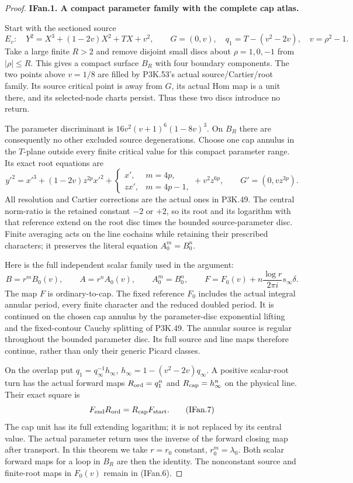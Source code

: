 \begin{proof}
\par\medskip\noindent\textbf{IFan.1. A compact parameter family with the complete cap atlas.}\par\nopagebreak[4]

Start with the sectioned source
\[
 E_v:\quad Y^2=X^3+(1-2v)X^2+TX+v^2,\qquad G=(0,v),
 \quad q_1=T-(v^2-2v),\quad v=\rho^2-1.              \tag{IFan.4}
\]
Take a large finite \(R>2\) and remove disjoint small discs about
\(\rho=1,0,-1\) from \(|\rho|\le R\). This gives a compact surface
\(B_R\) with four boundary components. The two points above \(v=1/8\)
are filled by P3K.53's actual source/Cartier/root family. Its source
critical point is away from \(G\), its actual Hom map is a unit there,
and its selected-node charts persist. Thus these two discs introduce
no return.

The parameter discriminant is \(16v^2(v+1)^6(1-8v)^3\). On \(B_R\)
there are consequently no other excluded source degenerations. Choose
one cap annulus in the \(T\)-plane outside every finite critical value
for this compact parameter range. Its exact root equations are
\[
 y'^2=x'^3+(1-2v)z^{2p}x'^2+
 \begin{cases}x',&m=4p,\\zx',&m=4p-1,\end{cases}
 +v^2z^{6p},\qquad G'=(0,vz^{3p}).                   \tag{IFan.5}
\]
All resolution and Cartier corrections are the actual ones in P3K.49.
The central norm-ratio is the retained constant \(-2\) or \(+2\), so
its root and its logarithm with that reference extend on the root
disc times the bounded source-parameter disc. Finite averaging acts
on the line cochains while retaining their prescribed characters;
it preserves the literal equation \(A_0^m=B_0^n\).

Here is the full independent scalar family used in the argument:
\[
 B=r^mB_0(v),\qquad A=r^nA_0(v),\qquad A_0^m=B_0^n,
 \qquad
 F=F_0(v)+n\frac{\log r}{2\pi i}s_\infty\delta.      \tag{IFan.6}
\]
The map \(F\) is ordinary-to-cap. The fixed reference \(F_0\) includes
the actual integral annular period, every finite character and the
reduced doubled period. It is continued on the chosen cap annulus by
the parameter-disc exponential lifting and the fixed-contour Cauchy
splitting of P3K.49. The annular source is regular throughout the
bounded parameter disc. Its full source and line maps therefore
continue, rather than only their generic Picard classes.

On the overlap put \(q_1=q_\infty^{-1}h_\infty\),
\(h_\infty=1-(v^2-2v)q_\infty\). A positive scalar-root turn has the
actual forward maps \(R_{\rm ord}=q_1^n\) and
\(R_{\rm cap}=h_\infty^n\) on the physical line. Their exact square is
\[
 F_{\rm end}R_{\rm ord}=R_{\rm cap}F_{\rm start}.     \tag{IFan.7}
\]
The cap unit has its full extending logarithm; it is not replaced by
its central value. The actual parameter return uses the inverse of
the forward closing map after transport. In this theorem we take
\(r=r_0\) constant, \(r_0^m=\lambda_0\). Both scalar forward maps for
a loop in \(B_R\) are then the identity. The nonconstant source and
finite-root maps in \(F_0(v)\) remain in (IFan.6).


\end{proof}
